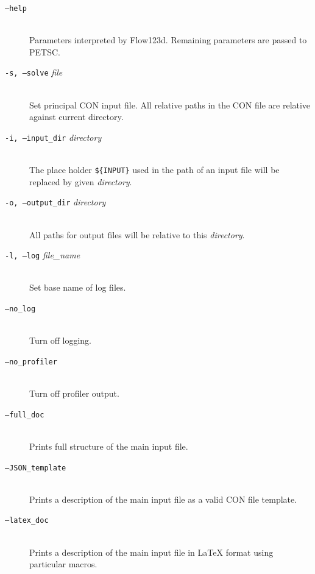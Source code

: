 \documentclass[12pt,a4paper]{report}
\begin{document}


\begin{description}
 \item[{\tt --help}] \hfill\\
        Parameters interpreted by Flow123d. Remaining parameters are passed to PETSC.
 \item[{\tt -s, --solve} {\it file}] \hfill\\
 	 Set principal CON input file. All relative paths in the CON file are relative against current directory.
 \item[{\tt -i, --input\_dir} {\it directory}] \hfill\\
 	The place holder \verb"${INPUT}" %
  	used in the path of an input file will be replaced by given {\it directory}.
 \item[{\tt -o, --output\_dir} {\it directory}] \hfill\\
 	All paths for output files will be relative to this {\it directory}. 
 \item[{\tt -l, --log} {\it file\_name}] \hfill\\
 	Set base name of log files.
 \item[{\tt --no\_log}] \hfill\\
        Turn off logging.
 \item[{\tt --no\_profiler}] \hfill\\
        Turn off profiler output.
 \item[{\tt --full\_doc}] \hfill\\
        Prints full structure of the main input file.
 \item[{\tt --JSON\_template}] \hfill\\
        Prints a description of the main input file as a valid CON file template.
 \item[{\tt --latex\_doc}] \hfill\\ 
        Prints a description of the main input file in LaTeX format using particular macros.
\end{description}
\end{document}
